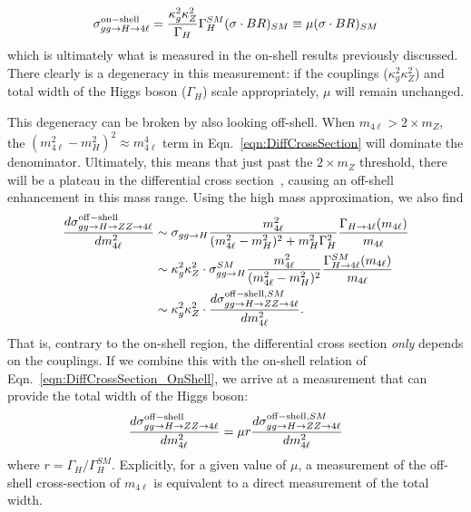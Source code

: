 \begin{equation}
\sigma_{gg\rightarrow H\rightarrow 4\ell}^{\rm on-shell} = \frac{\kappa_g^2\kappa_Z^2}{\Gamma_{H}}\Gamma_{H}^{SM}(\sigma\cdot BR)_{SM} \equiv \mu(\sigma\cdot BR)_{SM} 
\label{eqn:DiffCrossSection_OnShell}
\end{equation}
which is ultimately what is measured in the on-shell results previously discussed. There clearly is a degeneracy in this measurement: if the couplings ($\kappa_g^2\kappa_Z^2$) and total width of the Higgs boson ($\Gamma_H$) scale appropriately, $\mu$ will remain unchanged.

This degeneracy can be broken by also looking off-shell. When $m_{4\ell}>2\times m_{Z}$, the $(m_{4\ell}^2-m_{H}^2)^2 \approx m_{4\ell}^4$ term in Eqn.~\ref{eqn:DiffCrossSection} will dominate the denominator. Ultimately, this means that just past the $2\times m_{Z}$ threshold, there will be a plateau in the differential cross section~\cite{Kauer:2012hd,Kauer:1305.2092}, causing an off-shell enhancement in this mass range. Using the high mass approximation, we also find
\begin{equation}
\begin{split}
\frac{d\sigma_{gg\rightarrow H\rightarrow ZZ\rightarrow 4\ell}^{\rm off-shell}}{dm^2_{4\ell}} &\sim \sigma_{gg\rightarrow H} \frac{m_{4\ell}^2}{(m_{4\ell}^2-m_{H}^2)^2+m_H^2\Gamma_{H}^2}\frac{\Gamma_{H\rightarrow 4\ell}(m_{4\ell})}{m_{4\ell}} \\
&\sim \kappa_g^2\kappa_Z^2 \cdot \sigma_{gg\rightarrow H}^{SM} \frac{m_{4\ell}^2}{(m_{4\ell}^2-m_{H}^2)^2}\frac{\Gamma_{H\rightarrow 4\ell}^{SM}(m_{4\ell})}{m_{4\ell}} \\
&\sim \kappa_g^2\kappa_Z^2 \cdot \frac{d\sigma_{gg\rightarrow H\rightarrow ZZ\rightarrow 4\ell}^{{\rm off-shell},SM}}{dm^2_{4\ell}}.
\end{split}
\end{equation}
That is, contrary to the on-shell region, the differential cross section \textit{only} depends on the couplings. If we combine this with the on-shell relation of Eqn.~\ref{eqn:DiffCrossSection_OnShell}, we arrive at a measurement that can provide the total width of the Higgs boson:
\begin{equation}
\frac{d\sigma_{gg\rightarrow H\rightarrow ZZ\rightarrow 4\ell}^{\rm off-shell}}{dm^2_{4\ell}} = \mu r \frac{d\sigma_{gg\rightarrow H\rightarrow ZZ\rightarrow 4\ell}^{{\rm off-shell},SM}}{dm^2_{4\ell}}
\label{eqn:OffShellMeasurement}
\end{equation}
where $r=\Gamma_{H}/\Gamma_{H}^{SM}$. Explicitly, for a given value of $\mu$, a measurement of the off-shell cross-section of $m_{4\ell}$ is equivalent to a direct measurement of the total width.

